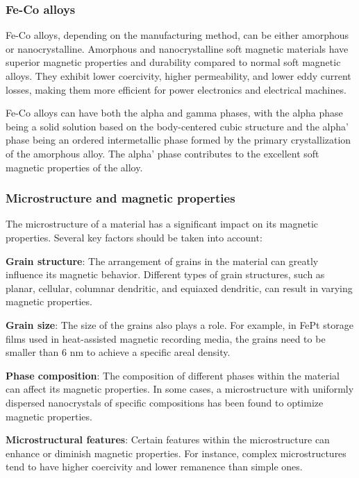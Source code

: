 \subsubsection{Fe-Co alloys}

Fe-Co alloys, depending on the manufacturing method, can be either amorphous or nanocrystalline. Amorphous and nanocrystalline soft magnetic materials have superior magnetic properties and durability compared to normal soft magnetic alloys. They exhibit lower coercivity, higher permeability, and lower eddy current losses, making them more efficient for power electronics and electrical machines.

Fe-Co alloys can have both the alpha and gamma phases, with the alpha phase being a solid solution based on the body-centered cubic structure and the alpha' phase being an ordered intermetallic phase formed by the primary crystallization of the amorphous alloy. The alpha' phase contributes to the excellent soft magnetic properties of the alloy.

\subsubsection{Microstructure and magnetic properties}

The microstructure of a material has a significant impact on its magnetic properties. Several key factors should be taken into account:

\textbf{Grain structure}: The arrangement of grains in the material can greatly influence its magnetic behavior. Different types of grain structures, such as planar, cellular, columnar dendritic, and equiaxed dendritic, can result in varying magnetic properties.

\textbf{Grain size}: The size of the grains also plays a role. For example, in FePt storage films used in heat-assisted magnetic recording media, the grains need to be smaller than 6 nm to achieve a specific areal density.

\textbf{Phase composition}: The composition of different phases within the material can affect its magnetic properties. In some cases, a microstructure with uniformly dispersed nanocrystals of specific compositions has been found to optimize magnetic properties.


\textbf{Microstructural features}: Certain features within the microstructure can enhance or diminish magnetic properties. For instance, complex microstructures tend to have higher coercivity and lower remanence than simple ones.

